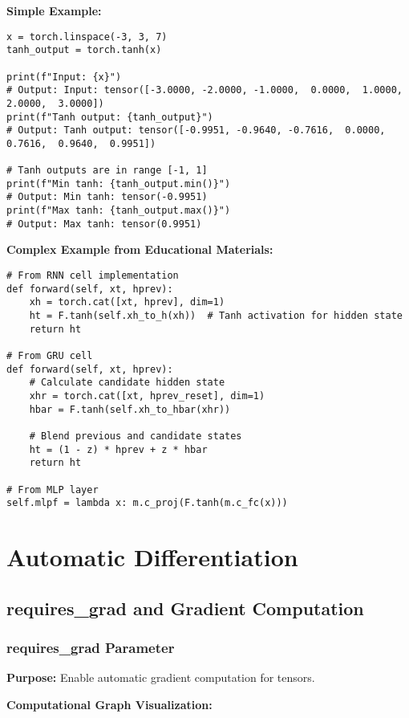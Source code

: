 \documentclass[11pt,a4paper]{book}
\begin{document}
\textbf{Simple Example:}
\begin{verbatim}
x = torch.linspace(-3, 3, 7)
tanh_output = torch.tanh(x)

print(f"Input: {x}")
# Output: Input: tensor([-3.0000, -2.0000, -1.0000,  0.0000,  1.0000,  2.0000,  3.0000])
print(f"Tanh output: {tanh_output}")
# Output: Tanh output: tensor([-0.9951, -0.9640, -0.7616,  0.0000,  0.7616,  0.9640,  0.9951])

# Tanh outputs are in range [-1, 1]
print(f"Min tanh: {tanh_output.min()}")
# Output: Min tanh: tensor(-0.9951)
print(f"Max tanh: {tanh_output.max()}")
# Output: Max tanh: tensor(0.9951)
\end{verbatim}

\textbf{Complex Example from Educational Materials:}
\begin{verbatim}
# From RNN cell implementation
def forward(self, xt, hprev):
    xh = torch.cat([xt, hprev], dim=1)
    ht = F.tanh(self.xh_to_h(xh))  # Tanh activation for hidden state
    return ht

# From GRU cell
def forward(self, xt, hprev):
    # Calculate candidate hidden state
    xhr = torch.cat([xt, hprev_reset], dim=1)
    hbar = F.tanh(self.xh_to_hbar(xhr))
    
    # Blend previous and candidate states
    ht = (1 - z) * hprev + z * hbar
    return ht

# From MLP layer
self.mlpf = lambda x: m.c_proj(F.tanh(m.c_fc(x)))
\end{verbatim}

\chapter{Automatic Differentiation}

\section{requires\_grad and Gradient Computation}

\subsection{requires\_grad Parameter}

\textbf{Purpose:} Enable automatic gradient computation for tensors.

\textbf{Computational Graph Visualization:}
\end{document}
